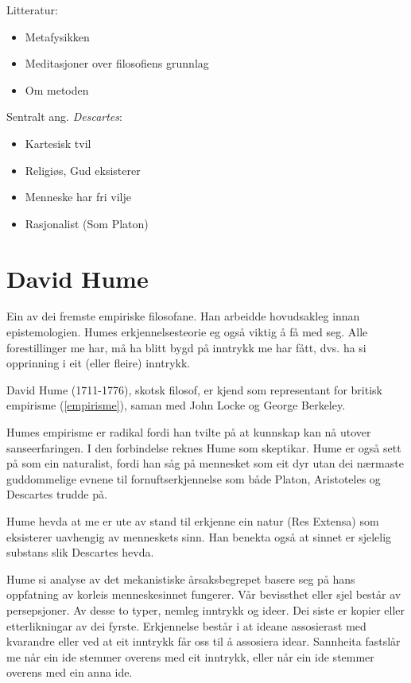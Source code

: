 \documentclass[a4paper]{IEEEtran}
\begin{document}
\begin{center}
Litteratur:
\end{center}
\begin{itemize}
    \item Metafysikken
    \item Meditasjoner over filosofiens grunnlag
    \item Om metoden
\end{itemize}\bigskip 

\begin{center}
Sentralt ang. \textit{Descartes}:
\end{center}
\begin{itemize}\bigskip
    \item Kartesisk tvil
    \item Religiøs, Gud eksisterer
    \item Menneske har fri vilje
    \item Rasjonalist (Som Platon)
\end{itemize}\bigskip

\section{David Hume}
\label{hume}\bigskip

Ein av dei fremste empiriske filosofane. Han arbeidde hovudsakleg innan epistemologien. Humes erkjennelsesteorie eg også viktig å få med seg. Alle forestillinger me har, må ha blitt bygd på inntrykk me har fått, dvs. ha si opprinning i eit (eller fleire) inntrykk.
\bigskip

David Hume (1711-1776), skotsk filosof, er kjend som representant for britisk empirisme (\ref{empirisme}), saman med John Locke og George Berkeley.\bigskip

Humes empirisme er radikal fordi han tvilte på at kunnskap kan nå utover sanseerfaringen. I den forbindelse reknes Hume som skeptikar. Hume er også sett på som ein naturalist, fordi han såg på mennesket som eit dyr utan dei nærmaste guddommelige evnene til fornuftserkjennelse som både Platon, Aristoteles og Descartes trudde på.\bigskip

Hume hevda at me er ute av stand til erkjenne ein natur (Res Extensa) som eksisterer uavhengig av menneskets sinn. Han benekta også at sinnet er sjelelig substans slik Descartes hevda. \bigskip

Hume si analyse av det mekanistiske årsaksbegrepet basere seg på hans oppfatning av korleis menneskesinnet fungerer. Vår bevissthet eller sjel består av persepsjoner. Av desse to typer, nemleg inntrykk og ideer. Dei siste er kopier eller etterlikningar av dei fyrste. Erkjennelse består i at ideane assosierast med kvarandre eller ved at eit inntrykk får oss til å assosiera idear. Sannheita fastslår me når ein ide stemmer overens med eit inntrykk, eller når ein ide stemmer overens med ein anna ide.\bigskip
\end{document}
